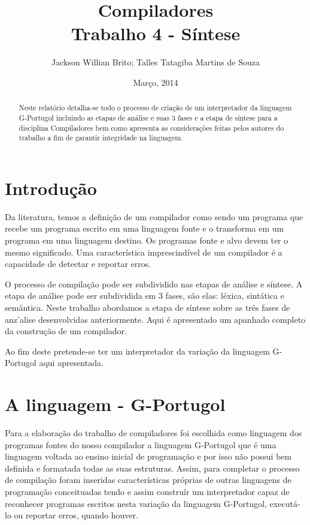 \documentclass[a4paper,12pt]{report}
\begin{document}
\title{Compiladores\\Trabalho 4 - S\'intese}
\author{Jackson Willian Brito; Talles Tatagiba Martins de Souza}
\date{Mar\c{c}o, 2014}
\maketitle

\pagebreak

\tableofcontents

\pagebreak

\renewcommand{\thesection}{\arabic{section}} 

\begin{abstract}
Neste relat\'orio detalha-se todo o processo de cria\c{c}\~ao de um interpretador da linguagem G-Portugol incluindo as etapas de an\'alise e suas 3 fases e a etapa de s\'intese para a disciplina Compiladores bem como apresenta as considera\c{c}\~oes feitas pelos autores do trabalho a fim de garantir integridade na linguagem.
\end{abstract}

\section{Introdu\c{c}\~ao}

Da literatura, temos a defini\c{c}\~ao de um compilador como sendo um programa que recebe um programa escrito em uma linguagem
fonte e o transforma em um programa em uma linguagem destino. Os programas fonte e alvo devem ter o mesmo significado. Uma caracter\'istica
imprescind\'ivel de um compilador \'e a capacidade de detectar e reportar erros.

O processo de compila\c{c}\~ao pode ser subdividido nas etapas de an\'alise e s\'intese. A etapa de an\'alise pode ser subdividida em 
3 fases, s\~ao elas: l\'exica, sint\'atica e sem\^antica. Neste trabalho abordamos a etapa de s\'intese sobre as tr\^es fases de anz'alise desenvolvidas anteriormente. Aqui \'e apresentado um apanhado completo da constru\c{c}\~ao de um compilador.

Ao fim deste pretende-se ter um interpretador da varia\c{c}\~ao da linguagem G-Portugol
aqui apresentada. 

\section{A linguagem - G-Portugol}

Para a elabora\c{c}\~ao do trabalho de compiladores foi escolhida como linguagem dos programas fontes do nosso compilador a
linguagem G-Portugol que \'e uma linguagem voltada ao ensino inicial de programa\c{c}\~ao e por isso n\~ao possui bem definida e
formatada todas as suas estruturas. Assim, para completar o processo de compila\c{c}\~ao foram inseridas caracter\'isticas
pr\'oprias de outras linguagens de programa\c{c}\~ao conceituadas tendo e assim constru\'ir um interpretador capaz de reconhecer programas escritos nesta varia\c{c}\~ao da linguagem
G-Portugol, executá-lo ou reportar erros, quando houver.
\end{document}
